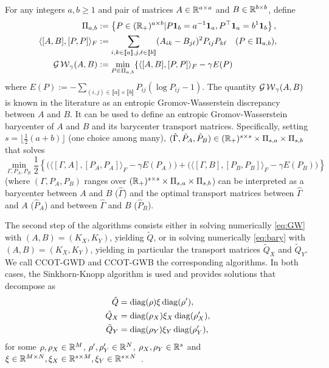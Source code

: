 For any integers  $a,b \geq 1$ and  pair of matrices $A  \in \mathbb{R}^{a\times a}$
and $B \in \mathbb{R}^{b\times b}$, define
\begin{align}
  \notag
  \Pi_{a,b}
  & := \left\{P \in (\mathbb{R}_{+})^{a \times b} | P\textbf{1}_{b} =
    a^{-1}\textbf{1}_{a},       P^{\top}       \textbf{1}_{a}      =       b^{1}
    \textbf{1}_{b}\right\}, \\
  \notag
  \langle [A,B], [P,P]\rangle_{F}
  & := \sum_{i,k\in \llbracket a\rrbracket, j,\ell\in \llbracket b\rrbracket} (A_{ik} - B_{j\ell})^{2} P_{ij}P_{k\ell}
    \quad (P \in \Pi_{a,b}),\\
  \label{eq:GW}
  \operatorname{\mathcal{G}\operatorname{\mathcal{W}}}_{\gamma} (A,B)
  &  :=  \min_{P \in  \Pi_{a,b}}  \{\langle  [A,B], [P,P]\rangle_{F}  -  \gamma
    E(P)\
\end{align}
where
$E(P) :=  -\sum_{(i,j)\in\llbracket a\rrbracket\times  \llbracket b\rrbracket}
P_{ij} (\log P_{ij}  - 1)$. The quantity $\operatorname{\mathcal{G}\operatorname{\mathcal{W}}}_{\gamma} (A,B)$  is known in the
literature  as  an entropic  Gromov-Wasserstein  discrepancy  between $A$  and
$B$. It can be used to define an entropic Gromov-Wasserstein barycenter of $A$
and  $B$  and  its   barycenter  transport  matrices.   Specifically,  setting
$s    =    \lfloor\frac{1}{2}(a+b)\rfloor$    (one   choice    among    many),
$(\hat{\Gamma}, \hat{P}_{A},  \hat{P}_{B}) \in (\mathbb{R}_{+})^{s \times  s} \times
\Pi_{s,a} \times \Pi_{s,b}$ that solves
\begin{equation}
  \label{eq:bary}
  \min_{\Gamma,  P_{A},   P_{B}} \frac{1}{2} \left\{\Big(\langle  [\Gamma,A],
    [P_{A},P_{A}]\rangle_{F} - \gamma E(P_{A}) \Big) + \Big(\langle  [\Gamma,B],
    [P_{B},P_{B}]\rangle_{F} - \gamma E(P_{B}) \Big)\right\} 
\end{equation}
(where        $(\Gamma,        P_{A},        P_{B})$        ranges        over
$(\mathbb{R}_{+})^{s  \times   s}  \times   \Pi_{s,a}  \times  \Pi_{s,b}$)   can  be
interpreted  as a  barycenter between  $A$  and $B$  ($\hat{\Gamma}$) and  the
optimal transport matrices between  $\hat{\Gamma}$ and $A$ ($\hat{P}_{A}$) and
between $\hat{\Gamma}$ and $B$ ($\hat{P}_{B}$).

The  second step  of the  algorithms  consists either  in solving  numerically
\eqref{eq:GW}  with $(A,B)  =  (K_{X}, K_{Y})$,  yielding  $\tilde{Q}$, or  in
solving numerically \eqref{eq:bary} with $(A,B) = (K_{X}, K_{Y})$, yielding in
particular the transport matrices $\tilde{Q}_{X}$ and $\tilde{Q}_{Y}$. We call
CCOT-GWD  and  CCOT-GWB the  corresponding  algorithms.   In both  cases,  the
Sinkhorn-Knopp algorithm is used and provides solutions that decompose as
\begin{align*}
  \tilde{Q} & = \operatorname{diag}(\rho) \xi \operatorname{diag}(\rho'),\\
  \tilde{Q}_{X} & = \operatorname{diag}(\rho_{X}) \xi_{X} \operatorname{diag}(\rho_{X}'),\\
  \tilde{Q}_{Y} & = \operatorname{diag}(\rho_{Y}) \xi_{Y} \operatorname{diag}(\rho_{Y}'),
\end{align*}
for some  $\rho, \rho_{X} \in  \mathbb{R}^{M}$, $\rho', \rho_{Y}'  \in \mathbb{R}^{N}$,
$\rho_{X},          \rho_{Y}           \in          \mathbb{R}^{s}$          and
$\xi \in \mathbb{R}^{M\times N}, \xi_{X} \in  \mathbb{R}^{s \times M}, \xi_{Y} \in \mathbb{R}^{s
  \times N}$~\cite{peyre:hal-01322992}.

